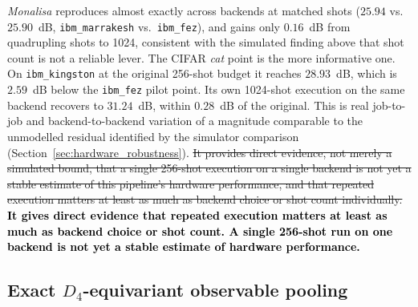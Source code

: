 \documentclass[pdflatex,sn-basic]{sn-jnl}
\newcommand{\del}[1]{\sout{#1}}
\newcommand{\add}[1]{\textbf{\textcolor{black}{#1}}}
\begin{document}
\textit{Monalisa} reproduces almost exactly across backends at matched shots
($25.94$ vs.\ $25.90$~dB, \texttt{ibm\_marrakesh} vs.\ \texttt{ibm\_fez}), and
gains only $0.16$~dB from quadrupling shots to 1024, consistent with the
simulated finding above that shot count is not a reliable lever. The CIFAR
\textit{cat} point is the more informative one. On \texttt{ibm\_kingston} at the
original 256-shot budget it reaches $28.93$~dB, which is $2.59$~dB below the
\texttt{ibm\_fez} pilot point. Its own 1024-shot execution on the same backend
recovers to $31.24$~dB, within $0.28$~dB of the original. This is real
job-to-job and backend-to-backend variation of a magnitude comparable to the
unmodelled residual identified by the simulator comparison
(Section~\ref{sec:hardware_robustness}). \del{It provides direct evidence, not merely
a simulated bound, that a single 256-shot execution on a single backend is not
yet a stable estimate of this pipeline's hardware performance, and that repeated
execution matters at least as much as backend choice or shot count individually.}
\add{It gives direct evidence that repeated execution matters at least as much as
backend choice or shot count. A single 256-shot run on one backend is not yet a
stable estimate of hardware performance.}

\subsection{Exact \texorpdfstring{$D_4$}{D4}-equivariant observable pooling}
\label{sec:d4}
\label{sec:symmetry}
\end{document}
